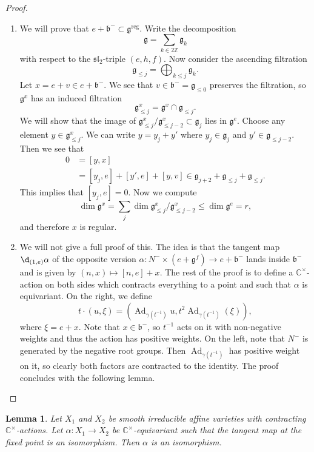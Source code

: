 \documentclass{amsart}
\newtheorem{lem}[thm]{Lemma}
\theoremstyle{definition}
\theoremstyle{remark}
\theoremstyle{plain}
\theoremstyle{definition}
\theoremstyle{remark}
\newcommand{\C}{\mathbb{C}}
\newcommand{\Z}{\mathbb{Z}}
\newcommand{\g}{\mathfrak{g}}
\renewcommand{\b}{\mathfrak{b}}
\newcommand{\mf}[1]{\mathfrak{#1}}
\newcommand{\on}[1]{\operatorname{#1}}
\newcommand{\1}{\mathbf{1}}
\newcommand{\2}{\mathbf{2}}
\newcommand{\3}{\mathbf{3}}
\renewcommand{\sl}{\mf{sl}}
\DeclareMathOperator{\Ad}{Ad}
\begin{document}
\begin{proof}\leavevmode
    \begin{enumerate}
        \item We will prove that \(e + \b^- \subset \g^{\on{reg}}\). Write the decomposition
        \[ \g = \sum_{k \in 2\Z} \g_k \]
        with respect to the \(\sl_2\)-triple \((e,h,f)\). Now consider the ascending filtration
        \[ \g_{\leq j} = \bigoplus_{k \leq j} \g_k. \]
        Let \(x = e+v \in e+\b^-\). We see that \(v \in \b^- = \g_{\leq 0}\) preserves the filtration, so \(\g^x\) has an induced filtration
        \[ \g_{\leq j}^x = \g^x \cap \g_{\leq j}. \]
        We will show that the image of \(\g^x_{\leq j} / \g^x_{\leq j-2} \subset \g_j\) lies in \(\g^e\). Choose any element \(y \in \g_{\leq j}^x\). We can write \(y = y_j + y'\) where \(y_j \in \g_j\) and \(y' \in \g_{\leq j-2}\). Then we see that
        \begin{align*}
            0 &= [y, x] \\
            &= [y_j, e] + [y', e] + [y, v] \in \g_{j+2} + \g_{\leq j} + \g_{\leq j}.
        \end{align*}
        This implies that \([y_j, e] = 0\). Now we compute
        \[ \dim \g^x = \sum_j \dim \g_{\leq j}^x / \g_{\leq j-2}^x \leq \dim \g^e = r, \]
        and therefore \(x\) is regular. 
        \item We will not give a full proof of this. The idea is that the tangent map \(\d_{(1,e)}\alpha\) of the opposite version \(\alpha \colon N^- \times (e+\g^f) \to e + \b^-\) lands inside \(\b^-\) and is given by \((n,x) \mapsto [n,e]+x\). The rest of the proof is to define a \(\C^{\times}\)-action on both sides which contracts everything to a point and such that \(\alpha\) is equivariant. On the right, we define
        \[ t \cdot (u, \xi) = (\Ad_{\gamma(t^{-1})}u, t^2 \Ad_{\gamma(t^{-1})}(\xi)), \]
        where \(\xi = e+x\). Note that \(x \in \b^-\), so \(t^{-1}\) acts on it with non-negative weights and thus the action has positive weights. On the left, note that \(N^-\) is generated by the negative root groups. Then \(\Ad_{\gamma(t^{-1})}\) has positive weight on it, so clearly both factors are contracted to the identity. The proof concludes with the following lemma. \qedhere
    \end{enumerate}
\end{proof}

\begin{lem}
    Let \(X_1\) and \(X_2\) be smooth irreducible affine varieties with contracting \(\C^{\times}\)-actions. Let \(\alpha \colon X_1 \to X_2\) be \(\C^{\times}\)-equivariant such that the tangent map at the fixed point is an isomorphism. Then \(\alpha\) is an isomorphism.
\end{lem}
\end{document}
